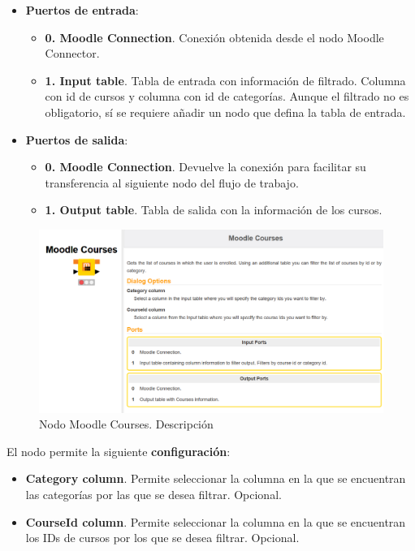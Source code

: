 \begin{itemize}
	\item \textbf{Puertos de entrada}: 
    \begin{itemize}
		\item \textbf{0. Moodle Connection}. Conexión obtenida desde el nodo Moodle Connector. 
		\item \textbf{1. Input table}. Tabla de entrada con información de filtrado. 
		Columna con id de cursos y columna con id de categorías. Aunque el filtrado no es obligatorio, sí se 
		requiere añadir un nodo que defina la tabla de entrada. 
   	\end{itemize}

	\item \textbf{Puertos de salida}: 
    \begin{itemize}
		\item \textbf{0. Moodle Connection}. Devuelve la conexión para facilitar su transferencia al siguiente nodo del flujo de trabajo. 
		\item \textbf{1. Output table}. Tabla de salida con la información de los cursos. 
   	\end{itemize}

\end{itemize}

\begin{figure}[!h]
	\centering
	\includegraphics[width=1\textwidth]{img/nodes_moodle_courses.png}
	\caption{Nodo Moodle Courses. Descripción}
	\label{fig:moodlecourses}
\end{figure}
\FloatBarrier



El nodo permite la siguiente \textbf{configuración}: 

\begin{itemize}
   \item \textbf{Category column}. Permite seleccionar la columna en la que se encuentran las categorías por las que se desea filtrar. Opcional. 
   \item \textbf{CourseId column}. Permite seleccionar la columna en la que se encuentran los IDs de cursos por los que se desea filtrar. Opcional. 
\end{itemize}

